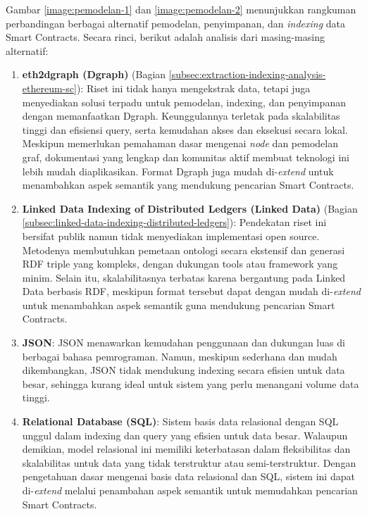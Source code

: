 Gambar \ref{image:pemodelan-1} dan \ref{image:pemodelan-2} menunjukkan rangkuman perbandingan berbagai alternatif pemodelan, penyimpanan, dan \textit{indexing} data Smart Contracts. Secara rinci, berikut adalah analisis dari masing-masing alternatif:

\begin{enumerate}
	\item \textbf{eth2dgraph (Dgraph)} \parencite{aimar2023extraction} (Bagian \ref{subsec:extraction-indexing-analysis-ethereum-sc}): Riset ini tidak hanya mengekstrak data, tetapi juga menyediakan solusi terpadu untuk pemodelan, indexing, dan penyimpanan dengan memanfaatkan Dgraph. Keunggulannya terletak pada skalabilitas tinggi dan efisiensi query, serta kemudahan akses dan eksekusi secara lokal. Meskipun memerlukan pemahaman dasar mengenai \textit{node} dan pemodelan graf, dokumentasi yang lengkap dan komunitas aktif membuat teknologi ini lebih mudah diaplikasikan. Format Dgraph juga mudah di-\textit{extend} untuk menambahkan aspek semantik yang mendukung pencarian Smart Contracts.

	\item \textbf{Linked Data Indexing of Distributed Ledgers (Linked Data)} \parencite{third2017linked} (Bagian \ref{subsec:linked-data-indexing-distributed-ledgers}): Pendekatan riset ini bersifat publik namun tidak menyediakan implementasi open source. Metodenya membutuhkan pemetaan ontologi secara ekstensif dan generasi RDF triple yang kompleks, dengan dukungan tools atau framework yang minim. Selain itu, skalabilitasnya terbatas karena bergantung pada Linked Data berbasis RDF, meskipun format tersebut dapat dengan mudah di-\textit{extend} untuk menambahkan aspek semantik guna mendukung pencarian Smart Contracts.

	\item \textbf{JSON}: JSON menawarkan kemudahan penggunaan dan dukungan luas di berbagai bahasa pemrograman. Namun, meskipun sederhana dan mudah dikembangkan, JSON tidak mendukung indexing secara efisien untuk data besar, sehingga kurang ideal untuk sistem yang perlu menangani volume data tinggi.

	\item \textbf{Relational Database (SQL)}: Sistem basis data relasional dengan SQL unggul dalam indexing dan query yang efisien untuk data besar. Walaupun demikian, model relasional ini memiliki keterbatasan dalam fleksibilitas dan skalabilitas untuk data yang tidak terstruktur atau semi-terstruktur. Dengan pengetahuan dasar mengenai basis data relasional dan SQL, sistem ini dapat di-\textit{extend} melalui penambahan aspek semantik untuk memudahkan pencarian Smart Contracts.
\end{enumerate}